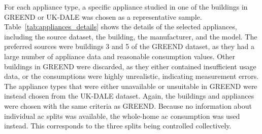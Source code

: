 For each appliance type, a specific appliance studied in one of the buildings in GREEND or UK-DALE was chosen as a representative sample. Table~\ref{tab:appliances_details} shows the details of the selected appliances, including the source dataset, the building, the manufacturer, and the model. The preferred sources were buildings 3 and 5 of the GREEND dataset, as they had a large number of appliance data and reasonable consumption values. Other buildings in GREEND were discarded, as they either contained insufficient usage data, or the consumptions were highly unrealistic, indicating measurement errors. The appliance types that were either unavailable or unsuitable in GREEND were instead chosen from the UK-DALE dataset. Again, the buildings and appliances were chosen with the same criteria as GREEND. Because no information about individual \acrshort{ac} splits was available, the whole-home \acrshort{ac} consumption was used instead. This corresponds to the three splits being controlled collectively.

\begin{table}
  \centering
  \caption[Details of selected appliances]{Details of selected appliances. Empty cells indicate that the information is not provided}
  \label{tab:appliances_details}
\end{table}

